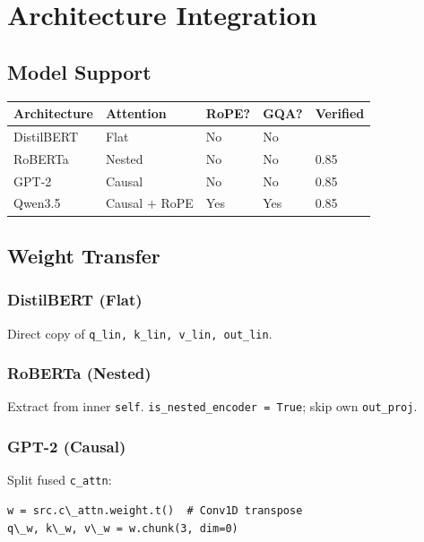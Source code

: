 
\section{Architecture Integration}

\subsection{Model Support}

\begin{table}[H]
\centering
\small
\begin{tabular}{lllll}
\toprule
\textbf{Architecture} & \textbf{Attention} & \textbf{RoPE?} & \textbf{GQA?} & \textbf{Verified} \\
\midrule
DistilBERT & Flat & No & No &  \\
RoBERTa & Nested & No & No & 0.85 \\
GPT-2 & Causal & No & No & 0.85 \\
Qwen3.5 & Causal + RoPE & Yes & Yes & 0.85 \\
\bottomrule
\end{tabular}
\end{table}

\subsection{Weight Transfer}

\subsubsection{DistilBERT (Flat)}

Direct copy of \texttt{q\_lin, k\_lin, v\_lin, out\_lin}.

\subsubsection{RoBERTa (Nested)}

Extract from inner \texttt{self}. \texttt{is\_nested\_encoder = True}; skip own \texttt{out\_proj}.

\subsubsection{GPT-2 (Causal)}

Split fused \texttt{c\_attn}:

\begin{lstlisting}
w = src.c\_attn.weight.t()  # Conv1D transpose
q\_w, k\_w, v\_w = w.chunk(3, dim=0)
\end{lstlisting}

